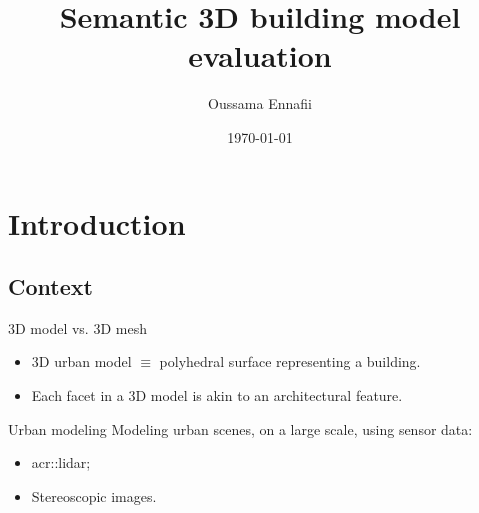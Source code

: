 \documentclass[export]{beamer}
\title{Semantic 3D building model evaluation}
\subtitle{}
\institute[LaSTIG STRUDEL]{Univ. Paris Est, LaSTIG STRUDEL, IGN, ENSG}
\date{\today}
\author[O.Ennafii]{Oussama Ennafii}
\begin{document}
    \begin{frame}[plain]
        \titlepage{}
    \end{frame}

    \section{Introduction}
        \subsection{Context}
            \begin{frame}{3D model vs. 3D mesh}
                \begin{itemize}[label=$\blacktriangleright$, font=\color{IGNGreen}]
                    \item<1-> 3D urban model $\equiv$ polyhedral surface representing a building.
                    \item<2-> Each facet in a 3D model is akin to an architectural feature.
                \end{itemize}
            \end{frame}
            \begin{frame}{Urban modeling}
                Modeling urban scenes, on a large scale, using sensor data:
                \begin{itemize}[label=$\blacktriangleright$, font=\color{IGNGreen}]
                    \item \acrfull{acr::lidar};
                    \item Stereoscopic images.
                \end{itemize}
            \end{frame}
\end{document}
